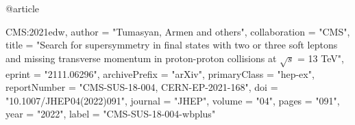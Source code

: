 @article{CMS:2021edw,
    author = "Tumasyan, Armen and others",
    collaboration = "CMS",
    title = "{Search for supersymmetry in final states with two or three soft leptons and missing transverse momentum in proton-proton collisions at $ \sqrt{s} $ = 13 TeV}",
    eprint = "2111.06296",
    archivePrefix = "arXiv",
    primaryClass = "hep-ex",
    reportNumber = "CMS-SUS-18-004, CERN-EP-2021-168",
    doi = "10.1007/JHEP04(2022)091",
    journal = "JHEP",
    volume = "04",
    pages = "091",
    year = "2022",
    label = "CMS-SUS-18-004-wbplus"

}


